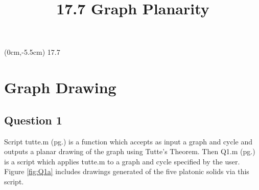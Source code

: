 \documentclass[a4paper]{article}
\title{\vspace*{2cm}17.7 Graph Planarity\vspace*{-1.5cm}}
\date{}
\begin{document}
\maketitle

\begin{textblock*}{100mm}(0cm,-5.5cm)
\Huge 17.7
\end{textblock*}

\section*{Graph Drawing}
\subsection*{Question 1}
Script tutte.m (pg.\pageref{Ptutte}) is a function which accepts as input a graph and cycle and outputs a planar drawing of the graph using Tutte's Theorem. Then Q1.m (pg.\pageref{PQ1}) is a script which applies tutte.m to a graph and cycle specified by the user. Figure \ref{fig:Q1a} includes drawings generated of the five platonic solids via this script.
\end{document}
